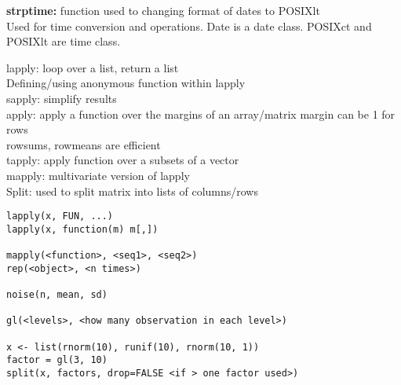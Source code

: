 \documentclass[12pt,a4paper]{report}
\begin{document}
{\color{Cyan}\bf strptime:} function used to changing format of dates to POSIXlt\\
 Used for time conversion and operations. Date is a date class. POSIXct and POSIXlt are time class.



\begin{tcolorbox}[colback=pageyl,colframe=pagebl,title= R \hfill Looping Functions,coltitle=Magenta,fonttitle=\bfseries,coltext=Black,width=0.9\paperwidth,boxrule=2mm]\colorbox{pageyl}{\noindent\begin{minipage}[t]{0.3\textwidth}\sffamily \color{ctnb}\vspace{\baselineskip}
lapply: loop over a list, return a list \\
Defining/using anonymous function within lapply\\[\baselineskip]
sapply: simplify results\\[\baselineskip]
apply: apply a function over the margins of an array/matrix margin can be 1 for rows \\
 rowsums, rowmeans are efficient \\[\baselineskip]
tapply: apply function over a subsets of a vector\\[\baselineskip]
mapply: multivariate version of lapply\\[\baselineskip]
Split: used to split matrix into lists of columns/rows
\end{minipage}}\qquad\begin{minipage}[t]{0.672\textwidth}
{\begin{lstlisting}[frame=single,framerule=0pt, numbers=none, numbersep=10pt, aboveskip=20pt,belowskip=20pt]
lapply(x, FUN, ...)
lapply(x, function(m) m[,])

mapply(<function>, <seq1>, <seq2>)
rep(<object>, <n times>)

noise(n, mean, sd)

gl(<levels>, <how many observation in each level>)

x <- list(rnorm(10), runif(10), rnorm(10, 1))
factor = gl(3, 10)
split(x, factors, drop=FALSE <if > one factor used>)
\end{lstlisting}}\end{minipage}\end{tcolorbox}
\end{document}
